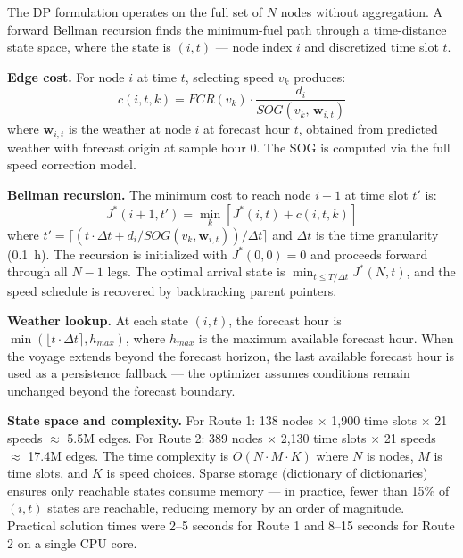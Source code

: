 \documentclass[review,authoryear]{elsarticle}  %
\begin{document}
The DP formulation operates on the full set of $N$ nodes without aggregation. A forward Bellman recursion finds the minimum-fuel path through a time-distance state space, where the state is $(i, t)$ --- node index $i$ and discretized time slot $t$.

\textbf{Edge cost.} For node $i$ at time $t$, selecting speed $v_k$ produces:
\begin{equation}
    c(i, t, k) = FCR(v_k) \cdot \frac{d_i}{SOG(v_k,\, \mathbf{w}_{i,t})}
    \label{eq:dp-cost}
\end{equation}
where $\mathbf{w}_{i,t}$ is the weather at node $i$ at forecast hour $t$, obtained from predicted weather with forecast origin at sample hour 0. The SOG is computed via the full speed correction model.

\textbf{Bellman recursion.} The minimum cost to reach node $i+1$ at time slot $t'$ is:
\begin{equation}
    J^*(i+1, t') = \min_{k} \left[ J^*(i, t) + c(i, t, k) \right]
    \label{eq:bellman}
\end{equation}
where $t' = \lceil (t \cdot \Delta t + d_i / SOG(v_k, \mathbf{w}_{i,t})) / \Delta t \rceil$ and $\Delta t$ is the time granularity (0.1~h). The recursion is initialized with $J^*(0, 0) = 0$ and proceeds forward through all $N-1$ legs. The optimal arrival state is $\min_{t \leq T/\Delta t} J^*(N, t)$, and the speed schedule is recovered by backtracking parent pointers.

\textbf{Weather lookup.} At each state $(i, t)$, the forecast hour is $\min(\lfloor t \cdot \Delta t \rceil, h_{max})$, where $h_{max}$ is the maximum available forecast hour. When the voyage extends beyond the forecast horizon, the last available forecast hour is used as a persistence fallback --- the optimizer assumes conditions remain unchanged beyond the forecast boundary.

\textbf{State space and complexity.} For Route 1: 138 nodes $\times$ 1,900 time slots $\times$ 21 speeds $\approx$ 5.5M edges. For Route 2: 389 nodes $\times$ 2,130 time slots $\times$ 21 speeds $\approx$ 17.4M edges. The time complexity is $O(N \cdot M \cdot K)$ where $N$ is nodes, $M$ is time slots, and $K$ is speed choices. Sparse storage (dictionary of dictionaries) ensures only reachable states consume memory --- in practice, fewer than 15\% of $(i, t)$ states are reachable, reducing memory by an order of magnitude. Practical solution times were 2--5 seconds for Route 1 and 8--15 seconds for Route 2 on a single CPU core.
\end{document}
